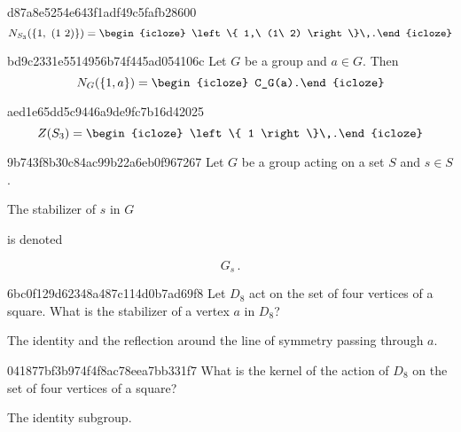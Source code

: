 \begin{note}{d87a8e5254e643f1adf49c5fafb28600}
    \[
        N_{S_3}(\left\{ 1,\ (1\ 2) \right\}) = \begin{icloze}{1}\left\{ 1,\ (1\ 2) \right\}\,.\end{icloze}
    \]
\end{note}

\begin{note}{bd9c2331e5514956b74f445ad054106c}
    Let \({ G }\) be a group and \({ a \in G }\).
    Then
    \[
        N_G(\left\{ 1, a \right\}) = \begin{icloze}{1}C_G(a).\end{icloze}
    \]
\end{note}

\begin{note}{aed1e65dd5c9446a9de9fc7b16d42025}
    \[
        Z(S_3) = \begin{icloze}{1}\left\{ 1 \right\}\,.\end{icloze}
    \]
\end{note}

\begin{note}{9b743f8b30c84ac99b22a6eb0f967267}
    Let \({ G }\) be a group acting on a set \({ S }\) and \({ s \in S }\).
    \begin{icloze}{2}The stabilizer of \({ s }\) in \({ G }\)\end{icloze} is denoted
    \begin{icloze}{1}
        \[
            G_s\,.
        \]
    \end{icloze}
\end{note}

\begin{note}{6bc0f129d62348a487c114d0b7ad69f8}
    Let \({ D_8 }\) act on the set of four vertices of a square.
    What is the stabilizer of a vertex \({ a }\) in \({ D_8 }\)?

    \begin{cloze}{1}
        The identity and the reflection around the line of symmetry passing through \({ a }\).
    \end{cloze}
\end{note}

\begin{note}{041877bf3b974f4f8ac78eea7bb331f7}
    What is the kernel of the action of \({ D_8 }\) on the set of four vertices of a square?

    \begin{cloze}{1}
        The identity subgroup.
    \end{cloze}
\end{note}

